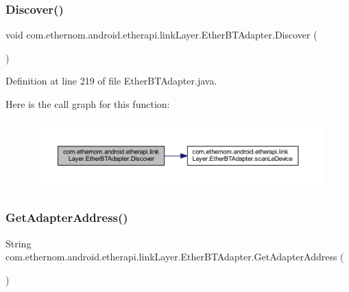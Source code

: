 \subsubsection{\texorpdfstring{Discover()}{Discover()}}
{\footnotesize\ttfamily void com.\+ethernom.\+android.\+etherapi.\+link\+Layer.\+Ether\+B\+T\+Adapter.\+Discover (\begin{DoxyParamCaption}{ }\end{DoxyParamCaption})}



Definition at line 219 of file Ether\+B\+T\+Adapter.\+java.

Here is the call graph for this function\+:\nopagebreak
\begin{figure}[H]
\begin{center}
\leavevmode
\includegraphics[width=350pt]{classcom_1_1ethernom_1_1android_1_1etherapi_1_1link_layer_1_1_ether_b_t_adapter_a21a0fe01522036d0e40372a8423e14aa_cgraph}
\end{center}
\end{figure}
\mbox{\label{classcom_1_1ethernom_1_1android_1_1etherapi_1_1link_layer_1_1_ether_b_t_adapter_a7af0ffd9265992004a5a0b67a5c7b68b}} 
\subsubsection{\texorpdfstring{Get\+Adapter\+Address()}{GetAdapterAddress()}}
{\footnotesize\ttfamily String com.\+ethernom.\+android.\+etherapi.\+link\+Layer.\+Ether\+B\+T\+Adapter.\+Get\+Adapter\+Address (\begin{DoxyParamCaption}{ }\end{DoxyParamCaption})}



